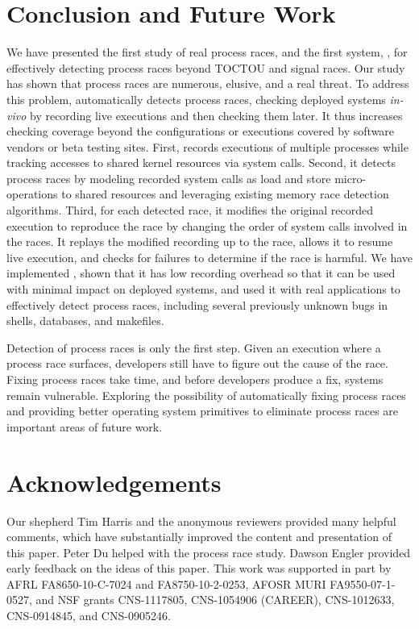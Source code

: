 \section{Conclusion and Future Work} \label{racepro:sec:conclusion}

We have presented the first study of real process races, and the first
system, \racepro, for effectively detecting process races beyond TOCTOU
and signal races.   Our study has shown that process races are
numerous, elusive, and a real threat.  To address this problem, \racepro
automatically detects process races, checking deployed
systems \emph{in-vivo} by recording live executions and then checking
them later.  It thus increases checking coverage beyond the
configurations or executions covered by software vendors or beta
testing sites.  First, \racepro records executions of multiple processes
while tracking accesses to shared kernel resources via system
calls. Second, it detects process races by modeling recorded system
calls as load and store micro-operations to shared resources and
leveraging existing memory race detection algorithms.  Third, for each
detected race, it modifies the original recorded execution to
reproduce the race by changing the order of system calls involved in
the races.  It replays the modified recording up to the race, allows
it to resume live execution, and checks for failures to determine if
the race is harmful.  We have implemented \racepro, shown that it has
low recording overhead so that it can be used with minimal impact on
deployed systems, and used it with real applications to effectively
detect \nracepro process races, including several previously unknown
bugs in shells, databases, and makefiles.

Detection of process races is only the first step.  Given an execution
where a process race surfaces, developers still have to figure out the
cause of the race.  Fixing process races take time, and before
developers produce a fix, systems remain vulnerable.  Exploring the
possibility of automatically fixing process races and providing better
operating system primitives to eliminate process races are important
areas of future work. 

\section*{Acknowledgements}

Our shepherd Tim Harris and the anonymous reviewers 
provided many helpful comments, which have substantially
improved the content and presentation of this paper.  Peter Du helped
with the process race study.  Dawson Engler provided early feedback on
the ideas of this paper.  This work was supported in part by 
AFRL FA8650-10-C-7024 and FA8750-10-2-0253, AFOSR MURI
FA9550-07-1-0527, and NSF grants CNS-1117805, CNS-1054906
(CAREER), CNS-1012633, CNS-0914845, and CNS-0905246.

